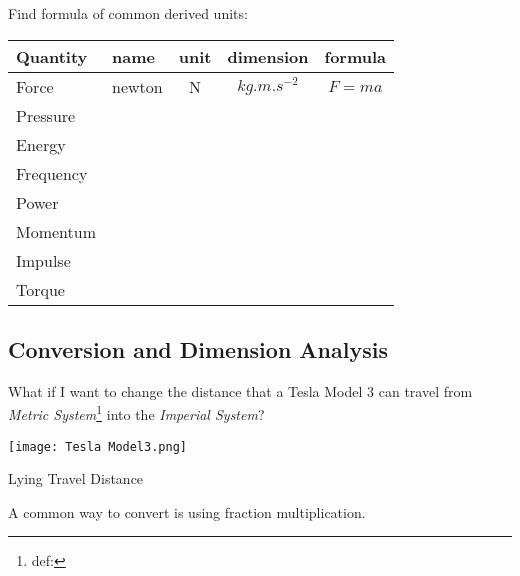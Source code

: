 \documentclass[12pt,a4paper]{tufte-handout}
\begin{document}
Find formula of common derived units:
\begin{table}
\begin{tabular}{|l|c|c|c|c|}
\hline
Quantity  & \multicolumn{1}{l|}{name} & \multicolumn{1}{l|}{unit} & \multicolumn{1}{l|}{dimension} & \multicolumn{1}{l|}{formula} \\ \hline
Force     & newton                    & N                         &$\si{kg.m.s^{-2}}$                                &   $F=ma$                           \\ \hline
Pressure  &  \hspace{0.7 in}      &                           &                                &   \hspace{0.7 in}                \\ \hline
Energy    &                           &                           &                                &                              \\ \hline
Frequency &                           &                           &                                &                              \\ \hline
Power     &                           &                           &                                &                              \\ \hline
Momentum  &                           &                           &                                &                              \\ \hline
Impulse   &                           &                           &                                &                              \\ \hline
Torque    &                           &                           &                                &                              \\ \hline
\end{tabular}
\end{table}


\subsection*{Conversion and Dimension Analysis}
What if I want to change the distance that a Tesla Model 3 can travel from \emph{Metric System}\footnote{def:} into the \emph{Imperial System}?
\begin{marginfigure}
	\texttt{[image: Tesla Model3.png]}
	\caption{Lying Travel Distance}
\end{marginfigure}
A common way to convert is using fraction multiplication.
\end{document}
